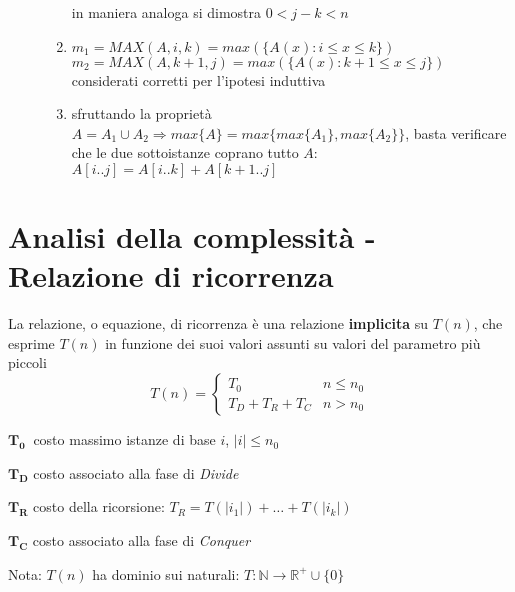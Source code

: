 \begin{description}
\begin{enumerate}[noitemsep,topsep=0pt,parsep=0pt,partopsep=0pt]
\begin{equation*}
                \end{equation*}
                in maniera analoga si dimostra $ 0 < j-k < n $ %
            \item 
                $m_1 = MAX(A,i,k) = max(\{A(x):i \leq x \leq k \}) $ \\
                $m_2 = MAX(A,k+1,j) = max(\{A(x):k+1 \leq x \leq j \}) $ \\
                considerati corretti per l'ipotesi induttiva
            \item sfruttando la proprietà $ A = A_1 \cup A_2 \Rightarrow max\{A\} = max\{max\{A_1\}, max\{A_2\}\}$,
                basta verificare che le due sottoistanze coprano tutto $A$: $A[i..j] = A[i..k] + A[k+1..j] $ %
        \end{enumerate}
\end{description}

\section{Analisi della complessità - Relazione di ricorrenza}
La relazione, o equazione, di ricorrenza è una relazione \textbf{implicita} su $T(n)$, che esprime $T(n)$ in funzione dei suoi valori assunti su valori del parametro più piccoli
\[
    T(n) = 
    \begin{cases} 
        T_0      &  n \leq n_0 \\
        T_D + T_R + T_C & n > n_0
    \end{cases}
\]
\begin{description}
    \item{$\bm{T_0}\:$} costo massimo istanze di base $i$, $|i| \leq n_0$
    \item{$\bm{T_D}$} costo associato alla fase di \textit{Divide}
    \item{$\bm{T_R}$} costo della ricorsione: $T_R = T(|i_1|) + \dots + T(|i_k|)$
    \item{$\bm{T_C}$} costo associato alla fase di \textit{Conquer}
\end{description}
Nota: $T(n)$ ha dominio sui naturali: $T : \mathbb{N} \rightarrow \mathbb{R}^{+} \cup \{0\}$

